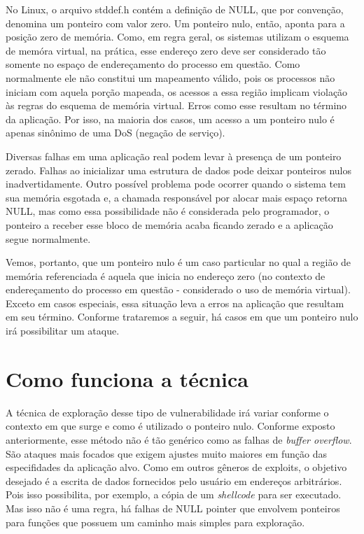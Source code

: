 		No Linux, o arquivo stddef.h contém a definição de NULL, que por
		convenção, denomina um ponteiro com valor zero.
		Um ponteiro nulo, então, aponta para a posição zero de memória. 
		Como, em regra geral, os sistemas utilizam o esquema de memóra virtual,
		na prática, esse endereço zero deve ser considerado tão somente no espaço
		de endereçamento do processo em questão.
		Como normalmente ele não constitui um mapeamento válido, pois os processos não
		iniciam com aquela porção mapeada, os acessos a essa região implicam violação
		às regras do esquema de memória virtual. Erros como esse resultam
		no término da aplicação. Por isso, na maioria dos casos, um acesso a um ponteiro
		nulo é apenas sinônimo de uma DoS (negação de serviço).


				
		Diversas falhas em uma aplicação real podem levar à presença de um ponteiro zerado.
		Falhas ao inicializar uma estrutura de dados pode deixar ponteiros nulos inadvertidamente.
		Outro possível problema pode ocorrer quando o sistema tem sua memória esgotada e, 
		a chamada responsável por alocar mais espaço retorna NULL, mas como essa possibilidade não é considerada
		pelo programador, o ponteiro a receber esse bloco de memória acaba ficando zerado e a aplicação
		segue normalmente.
		
		Vemos, portanto, que um ponteiro nulo é um caso particular no qual a região de memória
		referenciada é aquela que inicia no endereço zero (no contexto de endereçamento do
		processo em questão - considerado o uso de memória virtual). 
		Exceto em casos especiais, essa situação leva a erros na aplicação que resultam em seu término.
		Conforme trataremos a seguir, há casos em que um ponteiro nulo irá possibilitar um ataque.		

	\section{Como funciona a técnica}
		A técnica de exploração desse tipo de vulnerabilidade irá variar conforme o contexto
		em que surge e como é utilizado o ponteiro nulo. 
		Conforme exposto anteriormente, esse método não é tão genérico como as falhas de \textsl{buffer overflow}.
		São ataques mais focados que exigem ajustes muito maiores em função das especifidades da aplicação alvo.
		Como em outros gêneros de exploits, o objetivo desejado é a escrita de dados fornecidos 
		pelo usuário em endereços arbitrários. Pois isso possibilita, por exemplo,
		a cópia de um \textsl{shellcode} para ser executado. Mas isso não é uma regra, há falhas
		de NULL pointer que envolvem ponteiros para funções que possuem um caminho mais simples
		para exploração.

